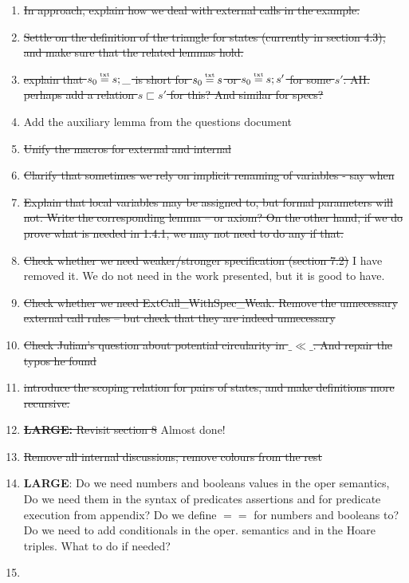 \documentclass[acmsmall,review,anonymous]{acmart}\settopmatter{printfolios=true}
\begin{document}
\begin{enumerate}
\item
\st{In approach, explain how we deal with external calls in the  example.}
\item
\st{Settle on the definition of  the triangle for states (currently in section 4.3), and make sure that the related lemmas hold.}
\item
\st{explain that $s_0\txteq s;\_$ is short for $s_0\txteq s$  or  $s_0\txteq s;s'$ for some $s'$. AH. perhaps add a relation $s \sqsubset s'$ for this? And similar for specs?}
\item
Add the auxiliary lemma from the questions document
\item
\st{Unify the macros for external and internal}

\item
\st{Clarify that sometimes we rely on implicit renaming of variables - say when}

\item
\st{Explain that local variables may be assigned to, but formal parameters will not. Write the corresponding lemma -- or axiom?
On the other hand, if we do prove what is needed in 1.4.1, we may not need to do any if that.}

\item
\st{Check whether we need weaker/stronger specification (section 7.2)} I have removed it. We do not need in the work presented, but it is good to have.

\item
\st{Check whether we need ExtCall\_WithSpec\_Weak. Remove the unnecessary external call rules -- but check that they are indeed unnecessary}

\item
\st{Check Julian's question about potential circularity in $\_\ll\_$. And repair the typos he found}
\item
\st{introduce the scoping relation for pairs of states, and make definitions more recursive.}

\item
\st{\textbf{LARGE:} Revisit section 8} Almost done!

\item
\st{Remove all internal discussions; remove colours from the rest}

\item

\textbf{LARGE}: Do we need numbers and booleans values in the oper semantics, 
Do we need them in the syntax of predicates assertions and for predicate execution from appendix?
Do we define $==$ for numbers and booleans to?  
Do we need to add conditionals in the oper. semantics and in the Hoare triples. What to do if needed?
\item


\end{enumerate}
\end{document}
